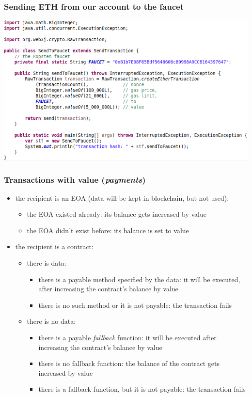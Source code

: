\documentclass[11pt]{beamer}  %
\begin{document}
\begin{frame}\frametitle{Sending ETH from our account to the faucet}

  \begin{center}
    \includegraphics[width=\textwidth,clip=false]{pictures/send-ether-transaction-java.png}
  \end{center}

\end{frame}

\begin{frame}\frametitle{Transactions with value (\emph{payments})}

  \begin{itemize}
  \item the recipient is an EOA (data will be kept in blockchain, but not used):
    \begin{itemize}
    \item the EOA existed already: its balance gets increased by value
    \item the EOA didn't exist before: its balance is set to value
    \end{itemize}
  \item the recipient is a contract:
    \begin{itemize}
    \item there is data:
      \begin{itemize}
      \item there is a \alert{payable} method specified by the data: it will be  executed, after increasing the contract's balance by value
      \item there is no such method or it is not payable: the transaction fails
      \end{itemize}
    \item there is no data:
      \begin{itemize}
      \item there is a \alert{payable \emph{fallback} function}: it will be executed after
        increasing the contract's balance by value
      \item there is no fallback function: the balance of the contract gets increased by value
      \item there is a fallback function, but it is not payable: the transaction fails
      \end{itemize}
    \end{itemize}
  \end{itemize}

\end{frame}
\end{document}
